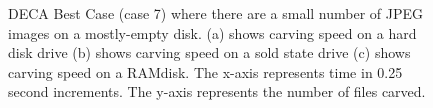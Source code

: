 \documentclass[final,5p,times,twocolumn,authoryear]{elsarticle}
\begin{document}
\begin{figure}%
	\centering
	\qquad
	\qquad
	
	\caption{DECA Best Case (case 7) where there are a small number of JPEG images on a mostly-empty disk. (a) shows carving speed on a hard disk drive (b) shows carving speed on a sold state drive (c) shows carving speed on a RAMdisk. The x-axis represents time in 0.25 second increments. The y-axis represents the number of files carved.}
	\label{fig:bestCase}
	
\end{figure}
\end{document}
